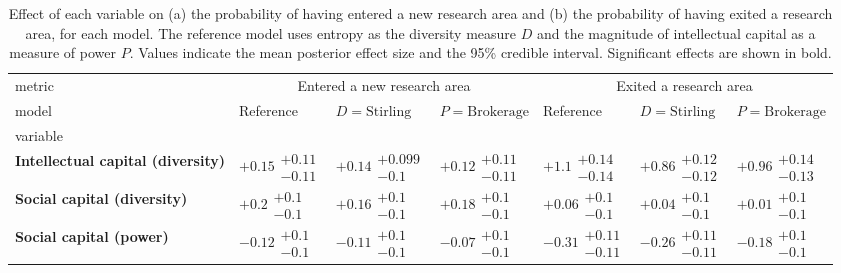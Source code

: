 \begin{table}[H]
\centering
\caption{Effect of each variable on (a) the probability of having entered a new research area and (b) the probability of having exited a research area, for each model. The reference model uses entropy as the diversity measure $D$ and the magnitude of intellectual capital as a measure of power $P$. Values indicate the mean posterior effect size and the 95\% credible interval. Significant effects are shown in bold.}
\label{table:summary_entered_exited}
\begin{tabular}{lllllll}
\toprule
metric & \multicolumn{3}{c}{Entered a new research area} & \multicolumn{3}{c}{Exited a research area} \\
model &                              Reference &                    $D=\text{Stirling}$ &                   $P=\text{Brokerage}$ &                              Reference &                    $D=\text{Stirling}$ &                   $P=\text{Brokerage}$ \\
variable                                  &                                        &                                        &                                        &                                        &                                        &                                        \\
\midrule
\textbf{Intellectual capital (diversity)} &  $\bm{+0.15}\substack{+0.11 \\ -0.11}$ &  $\bm{+0.14}\substack{+0.099 \\ -0.1}$ &  $\bm{+0.12}\substack{+0.11 \\ -0.11}$ &   $\bm{+1.1}\substack{+0.14 \\ -0.14}$ &  $\bm{+0.86}\substack{+0.12 \\ -0.12}$ &  $\bm{+0.96}\substack{+0.14 \\ -0.13}$ \\
\textbf{Social capital (diversity)}       &     $\bm{+0.2}\substack{+0.1 \\ -0.1}$ &    $\bm{+0.16}\substack{+0.1 \\ -0.1}$ &    $\bm{+0.18}\substack{+0.1 \\ -0.1}$ &         $+0.06\substack{+0.1 \\ -0.1}$ &         $+0.04\substack{+0.1 \\ -0.1}$ &         $+0.01\substack{+0.1 \\ -0.1}$ \\
\textbf{Social capital (power)}           &    $\bm{-0.12}\substack{+0.1 \\ -0.1}$ &    $\bm{-0.11}\substack{+0.1 \\ -0.1}$ &         $-0.07\substack{+0.1 \\ -0.1}$ &  $\bm{-0.31}\substack{+0.11 \\ -0.11}$ &  $\bm{-0.26}\substack{+0.11 \\ -0.11}$ &    $\bm{-0.18}\substack{+0.1 \\ -0.1}$ \\

\end{tabular}
\end{table}
